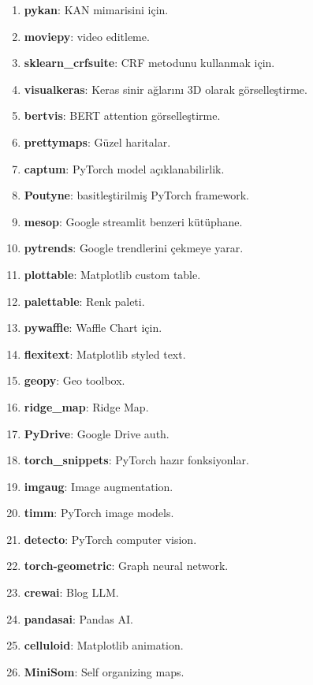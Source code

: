 \begin{enumerate}
    \item \textbf{pykan}: KAN mimarisini için.
    \item \textbf{moviepy}: video editleme.
    \item \textbf{sklearn\_crfsuite}: CRF metodunu kullanmak için.
    \item \textbf{visualkeras}: Keras sinir ağlarını 3D olarak görselleştirme.
    \item \textbf{bertvis}: BERT attention görselleştirme.
    \item \textbf{prettymaps}: Güzel haritalar.
    \item \textbf{captum}: PyTorch model açıklanabilirlik.
    \item \textbf{Poutyne}: basitleştirilmiş PyTorch framework.
    \item \textbf{mesop}: Google streamlit benzeri kütüphane.
    \item \textbf{pytrends}: Google trendlerini çekmeye yarar.
    \item \textbf{plottable}: Matplotlib custom table.
    \item \textbf{palettable}: Renk paleti.
    \item \textbf{pywaffle}: Waffle Chart için.
    \item \textbf{flexitext}: Matplotlib styled text.
    \item \textbf{geopy}: Geo toolbox.
    \item \textbf{ridge\_map}: Ridge Map.
    \item \textbf{PyDrive}: Google Drive auth.
    \item \textbf{torch\_snippets}: PyTorch hazır fonksiyonlar.
    \item \textbf{imgaug}: Image augmentation.
    \item \textbf{timm}: PyTorch image models.
    \item \textbf{detecto}: PyTorch computer vision.
    \item \textbf{torch-geometric}: Graph neural network.
    \item \textbf{crewai}: Blog LLM.
    \item \textbf{pandasai}: Pandas AI.
    \item \textbf{celluloid}: Matplotlib animation.
    \item \textbf{MiniSom}: Self organizing maps.
\end{enumerate}

\newpage

